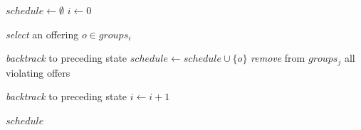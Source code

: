 \begin{algorithm}[H]
    \caption{Offering-Order Algorithm}
    \begin{algorithmic}[1]

        \State $schedule \gets \emptyset$
        \State $i \gets 0$

        \Loop
        \State \textit{select} an offering $o \in groups_i$

        \State \textit{backtrack} to preceding state
        \Else
        \State $schedule \gets schedule \cup \{o\}$
        \State \textit{remove} from $groups_j$ all violating offers
        \EndFor

        \State \textit{backtrack} to preceding state
        \Else
        \State $i \gets i + 1$

        \State \Return $schedule$
        \EndIf

        \EndIf
        \EndIf
        \EndLoop
    \end{algorithmic}
\end{algorithm}
